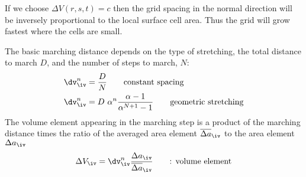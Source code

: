 If we choose $\Delta V(r,s,t)= c$ then the grid spacing in the normal direction will
be inversely proportional to the local surface cell area. Thus the grid will grow
fastest where the cells are small.


The basic marching distance depends on the type of stretching, the total distance to march $D$, and the
number of steps to march, $N$:
\begin{align*}
   \dv_\iv^n  &= { D \over N}  \qquad\mbox{constant spacing} \\
   \dv_\iv^n  &= D~ \alpha^n {\alpha -1 \over \alpha^{N+1} -1} \qquad\mbox{geometric stretching}
\end{align*}
The volume element appearing in the marching step is a product of the marching distance
times the ratio of the averaged area element $\das_\iv$ to the area element $\da_\iv$
\[
\Delta V_\iv = \dv_\iv^n { \da_\iv \over \das_\iv} \qquad\mbox{: volume element}
\]



